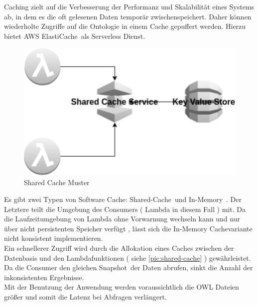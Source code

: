 \documentclass[
12pt,
english,
ngerman,
headsepline,
twoside,
openright,
numbers=noenddot,version=first
]{scrreprt}
\begin{document}
Caching zielt auf die Verbesserung der Performanz und Skalabilität eines Systems ab, in dem es die oft gelesenen Daten temporär zwischenspeichert. Daher können wiederholte Zugriffe auf die Ontologie in einem Cache gepuffert werden. Hierzu bietet \acrshort{AWS} \glqq ElastiCache\grqq\ als Serverless Dienst. 
\begin{figure}[H]
	\begin{center}
\includegraphics[scale=0.60]{./pics/aws/pattern-cache-shared.eps}	
\caption{Shared Cache Muster}	
\label{pic:shared-cache}
	\end{center}
\end{figure}
Es gibt zwei Typen von Software Cache: \glqq Shared-Cache\grqq\ und \glqq In-Memory\grqq\ \cite{patternsCloud}. Der Letztere teilt die Umgebung des Consumers ( Lambda in diesem Fall ) mit. Da die Laufzeitumgebung von Lambda ohne Vorwarnung wechseln kann und nur über nicht persistenten Speicher verfügt \cite{lambdaFaq}, lässt sich die In-Memory Cachevariante nicht konsistent implementieren.\\

Ein schnellerer Zugriff wird durch die Allokation eines Caches zwischen der Datenbasis und den Lambdafunktionen ( siehe \autoref{pic:shared-cache} ) gewährleistet. Da die Consumer den gleichen \glqq Snapshot\grqq\ der Daten abrufen, sinkt die Anzahl der inkonsistenten Ergebnisse.\cite{patternsCloud}\\

Mit der Benutzung der Anwendung werden voraussichtlich die \acrshort{OWL} Dateien größer und somit die Latenz bei Abfragen verlängert.
\end{document}
